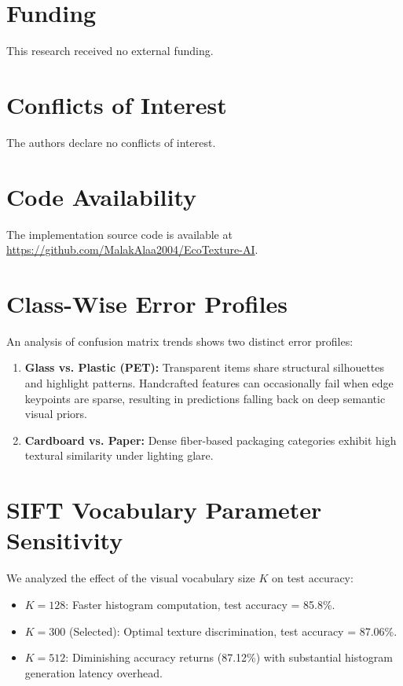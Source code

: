 \documentclass[12pt, a4paper]{article}
\begin{document}
\section*{Funding}
This research received no external funding.

\section*{Conflicts of Interest}
The authors declare no conflicts of interest.

\section*{Code Availability}
The implementation source code is available at \url{https://github.com/MalakAlaa2004/EcoTexture-AI}.

\appendix
\section{Class-Wise Error Profiles}
An analysis of confusion matrix trends shows two distinct error profiles:
\begin{enumerate}
    \item \textbf{Glass vs. Plastic (PET):} Transparent items share structural silhouettes and highlight patterns. Handcrafted features can occasionally fail when edge keypoints are sparse, resulting in predictions falling back on deep semantic visual priors.
    \item \textbf{Cardboard vs. Paper:} Dense fiber-based packaging categories exhibit high textural similarity under lighting glare.
\end{enumerate}

\section{SIFT Vocabulary Parameter Sensitivity}
We analyzed the effect of the visual vocabulary size $K$ on test accuracy:
\begin{itemize}
    \item $K=128$: Faster histogram computation, test accuracy = 85.8\%.
    \item $K=300$ (Selected): Optimal texture discrimination, test accuracy = 87.06\%.
    \item $K=512$: Diminishing accuracy returns (87.12\%) with substantial histogram generation latency overhead.
\end{itemize}
\end{document}
